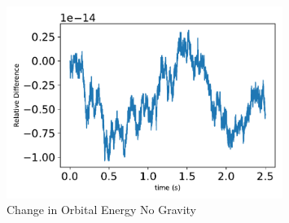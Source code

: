 \begin{figure}[htbp]\centerline{\includegraphics[width=0.8\textwidth]{AutoTeX/ChangeInOrbitalEnergyNoGravity}}\caption{Change in Orbital Energy No Gravity}\label{fig:ChangeInOrbitalEnergyNoGravity}\end{figure}